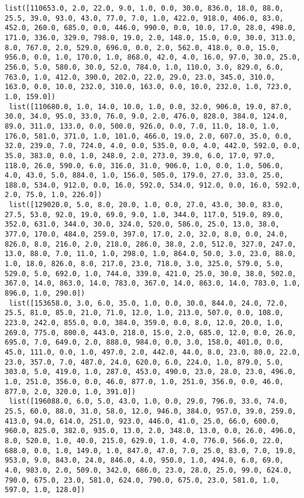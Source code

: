 \documentclass[11pt]{article}
\begin{document}
\begin{Verbatim}[commandchars=\\\{\}]
 list([110653.0, 2.0, 22.0, 9.0, 1.0, 0.0, 30.0, 836.0, 18.0, 88.0, 25.5, 39.0, 93.0, 43.0, 77.0, 7.0, 1.0, 422.0, 918.0, 406.0, 83.0, 452.0, 260.0, 685.0, 0.0, 446.0, 990.0, 0.0, 10.0, 17.0, 28.0, 498.0, 171.0, 336.0, 329.0, 798.0, 19.0, 2.0, 148.0, 15.0, 0.0, 30.0, 313.0, 8.0, 767.0, 2.0, 529.0, 696.0, 0.0, 2.0, 562.0, 418.0, 0.0, 15.0, 956.0, 0.0, 1.0, 170.0, 1.0, 868.0, 42.0, 4.0, 16.0, 97.0, 30.0, 25.0, 256.0, 5.0, 580.0, 30.0, 52.0, 784.0, 1.0, 110.0, 3.0, 829.0, 6.0, 763.0, 1.0, 412.0, 390.0, 202.0, 22.0, 29.0, 23.0, 345.0, 310.0, 163.0, 0.0, 10.0, 232.0, 310.0, 163.0, 0.0, 10.0, 232.0, 1.0, 723.0, 1.0, 159.0])
 list([110680.0, 1.0, 14.0, 10.0, 1.0, 0.0, 32.0, 906.0, 19.0, 87.0, 30.0, 34.0, 95.0, 33.0, 76.0, 9.0, 2.0, 476.0, 828.0, 384.0, 124.0, 89.0, 311.0, 133.0, 0.0, 500.0, 926.0, 0.0, 7.0, 11.0, 18.0, 1.0, 176.0, 581.0, 371.0, 1.0, 101.0, 466.0, 19.0, 2.0, 607.0, 35.0, 0.0, 32.0, 239.0, 7.0, 724.0, 4.0, 0.0, 535.0, 0.0, 4.0, 442.0, 592.0, 0.0, 35.0, 383.0, 0.0, 1.0, 248.0, 2.0, 273.0, 39.0, 6.0, 17.0, 97.0, 118.0, 26.0, 590.0, 6.0, 316.0, 31.0, 906.0, 1.0, 0.0, 1.0, 506.0, 4.0, 43.0, 5.0, 884.0, 1.0, 156.0, 505.0, 179.0, 27.0, 33.0, 25.0, 188.0, 534.0, 912.0, 0.0, 16.0, 592.0, 534.0, 912.0, 0.0, 16.0, 592.0, 2.0, 75.0, 1.0, 226.0])
 list([129020.0, 5.0, 8.0, 20.0, 1.0, 0.0, 27.0, 43.0, 30.0, 83.0, 27.5, 53.0, 92.0, 19.0, 69.0, 9.0, 1.0, 344.0, 117.0, 519.0, 89.0, 352.0, 631.0, 344.0, 30.0, 324.0, 520.0, 586.0, 25.0, 13.0, 38.0, 377.0, 170.0, 484.0, 259.0, 397.0, 17.0, 2.0, 32.0, 8.0, 0.0, 24.0, 826.0, 8.0, 216.0, 2.0, 218.0, 286.0, 38.0, 2.0, 512.0, 327.0, 247.0, 13.0, 88.0, 7.0, 11.0, 1.0, 298.0, 1.0, 864.0, 50.0, 3.0, 23.0, 88.0, 1.0, 18.0, 826.0, 8.0, 217.0, 23.0, 718.0, 3.0, 325.0, 579.0, 5.0, 529.0, 5.0, 692.0, 1.0, 744.0, 339.0, 421.0, 25.0, 30.0, 38.0, 502.0, 367.0, 14.0, 863.0, 14.0, 783.0, 367.0, 14.0, 863.0, 14.0, 783.0, 1.0, 896.0, 1.0, 290.0])
 list([153658.0, 3.0, 6.0, 35.0, 1.0, 0.0, 30.0, 844.0, 24.0, 72.0, 25.5, 81.0, 85.0, 21.0, 71.0, 12.0, 1.0, 213.0, 507.0, 0.0, 108.0, 223.0, 242.0, 855.0, 0.0, 384.0, 359.0, 0.0, 8.0, 12.0, 20.0, 1.0, 269.0, 775.0, 800.0, 443.0, 218.0, 15.0, 2.0, 685.0, 12.0, 0.0, 26.0, 695.0, 7.0, 649.0, 2.0, 888.0, 984.0, 0.0, 3.0, 158.0, 401.0, 0.0, 45.0, 111.0, 0.0, 1.0, 497.0, 2.0, 442.0, 44.0, 8.0, 23.0, 80.0, 22.0, 23.0, 357.0, 7.0, 487.0, 24.0, 620.0, 6.0, 224.0, 1.0, 879.0, 5.0, 303.0, 5.0, 419.0, 1.0, 287.0, 453.0, 490.0, 23.0, 28.0, 23.0, 496.0, 1.0, 251.0, 356.0, 0.0, 46.0, 877.0, 1.0, 251.0, 356.0, 0.0, 46.0, 877.0, 2.0, 320.0, 1.0, 391.0])
 list([196088.0, 6.0, 5.0, 43.0, 1.0, 0.0, 29.0, 796.0, 33.0, 74.0, 25.5, 60.0, 88.0, 31.0, 58.0, 12.0, 946.0, 384.0, 957.0, 39.0, 259.0, 413.0, 94.0, 614.0, 251.0, 923.0, 446.0, 41.0, 25.0, 66.0, 600.0, 960.0, 825.0, 382.0, 935.0, 13.0, 2.0, 348.0, 13.0, 0.0, 26.0, 496.0, 8.0, 520.0, 1.0, 40.0, 215.0, 629.0, 1.0, 4.0, 776.0, 566.0, 22.0, 688.0, 0.0, 1.0, 149.0, 1.0, 847.0, 47.0, 7.0, 25.0, 83.0, 7.0, 19.0, 953.0, 9.0, 843.0, 24.0, 846.0, 4.0, 950.0, 1.0, 494.0, 6.0, 69.0, 4.0, 983.0, 2.0, 509.0, 342.0, 686.0, 23.0, 28.0, 25.0, 99.0, 624.0, 790.0, 675.0, 23.0, 581.0, 624.0, 790.0, 675.0, 23.0, 581.0, 1.0, 597.0, 1.0, 128.0])

\end{Verbatim}
\end{document}

